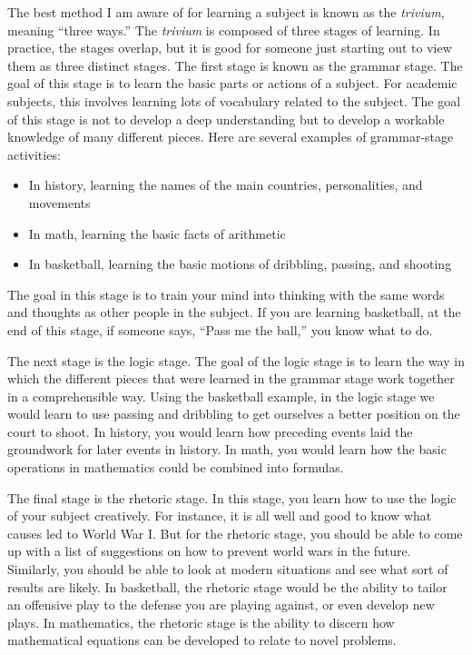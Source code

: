 The best method I am aware of for learning a subject is known as the
\textit{trivium}, meaning “three ways.”  The \textit{trivium} is
composed of three stages of learning. In practice, the stages overlap,
but it is good for someone just starting out to view them as three
distinct stages. The first stage is known as the grammar stage. The
goal of this stage is to learn the basic parts or actions of a subject.
For academic subjects, this involves learning lots of vocabulary
related to the subject. The goal of this stage is not to develop a deep
understanding but to develop a workable knowledge of many different
pieces. Here are several examples of grammar-stage activities:

\begin{itemize}
\item 
In history, learning the names of the main countries, personalities, and
movements
\item 
In math, learning the basic facts of arithmetic
\item 
In basketball, learning the basic motions of dribbling, passing, and
shooting
\end{itemize}

The goal in this stage is to train your mind into thinking with the same
words and thoughts as other people in the subject. If you are learning
basketball, at the end of this stage, if someone says, “Pass me the
ball,” you know what to do.

The next stage is the logic stage. The goal of the logic stage is to
learn the way in which the different pieces that were learned in the
grammar stage work together in a comprehensible way. Using the
basketball example, in the logic stage we would learn to use passing
and dribbling to get ourselves a better position on the court to shoot.
In history, you would learn how preceding events laid the groundwork
for later events in history. In math, you would learn how the basic
operations in mathematics could be combined into formulas.

The final stage is the rhetoric stage. In this stage, you learn how to
use the logic of your subject creatively. For instance, it is all well
and good to know what causes led to World War I. But for the rhetoric
stage, you should be able to come up with a list of suggestions on how
to prevent world wars in the future. Similarly, you should be able to
look at modern situations and see what sort of results are likely. In
basketball, the rhetoric stage would be the ability to tailor an
offensive play to the defense you are playing against, or even develop
new plays. In mathematics, the rhetoric stage is the ability to discern
how mathematical equations can be developed to relate to novel
problems.

